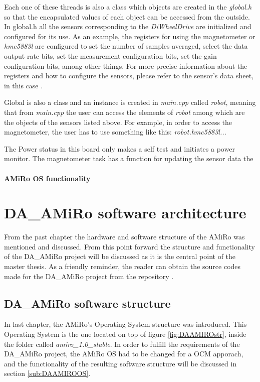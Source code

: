 \documentclass[12pt]{report}%
\begin{document}
Each one of these threads is also a class which objects are created in the \textit{global.h} so that the encapsulated values of each object can be accessed from the outside. In global.h all the sensors corresponding to the \textit{DiWheelDrive} are initialized and configured for its use. As an example, the registers for using the magnetometer or \textit{hmc5883l} are configured to set the number of samples averaged, select the data output rate bits, set the measurement configuration bits, set the gain configuration bits, among other things. For more precise information about the registers and how to configure the sensors, please refer to the sensor's data sheet, in this case \cite{magnetometerpart}.

Global is also a class and an instance is created in \textit{main.cpp} called \textit{robot}, meaning that from \textit{main.cpp} the user can access the elements of \textit{robot} among which are the objects of the sensors listed above. For example, in order to access the magnetometer, the user has to use something like this: \textit{robot.hmc5883l...}


The Power status in this board only makes a self test and initiates a power monitor. The magnetometer task has a function for updating the sensor data the



\subsubsection{AMiRo OS functionality}

\chapter{DA\_AMiRo software architecture}
From the past chapter the hardware and software structure of the AMiRo was mentioned and discussed. From this point forward the structure and functionality of the DA\_AMiRo project will be discussed as it is the central point of the master thesis. As a friendly reminder, the reader can obtain the source codes made for the DA\_AMiRo project from the repository \cite{AMiRo_Git}.

\section{DA\_AMiRo software structure}
In last chapter, the AMiRo's Operating System structure was introduced. This Operating System is the one located on top of figure \ref{fig:DAAMIROstr}, inside the folder called \textit{amiro\_1.0\_stable}. In order to fulfill the requirements of the DA\_AMiRo project, the AMiRo OS had to be changed for a OCM apporach, and the functionality of the resulting software structure will be discussed in section \ref{sub:DAAMIROOS}.
\end{document}
